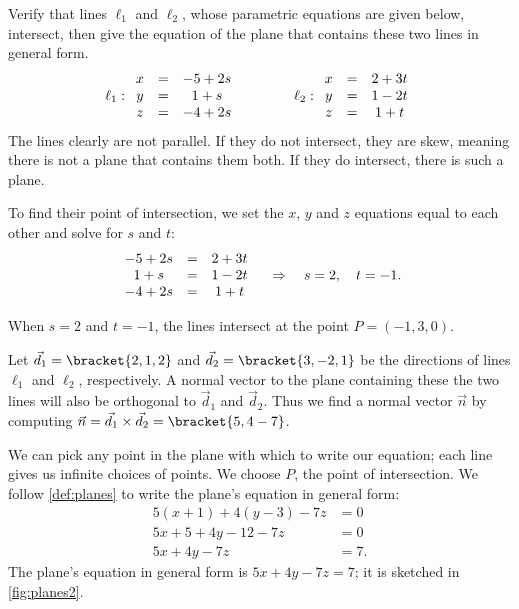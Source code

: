 \begin{example}\label{ex_planes2}%
Verify that lines $\ell_1$ and $\ell_2$, whose parametric equations are given below, intersect, then give the equation of the  plane that contains these two lines in general form.
\[
 \ell_1: \begin{array}{ c c c } x&=&-5+2s \\ y&=&1+s \\ z&=&-4+2s\end{array}
 \qquad\qquad
 \ell_2: \begin{array}{ c c c } x &=& 2+3t\\ y&=&1-2t \\ z&=&1+t\end{array}
\]
\solution
The lines clearly are not parallel. If they do not intersect, they are skew, meaning there is not a plane that contains them both. If they do intersect, there is such a plane. 

To find their point of intersection, we set the $x$, $y$ and $z$ equations equal to each other and solve for $s$ and $t$:
\[
 \begin{array}{ c c c }-5+2s &=&2+3t \\ 1+s &=& 1-2t \\ -4+2s &=& 1+t \end{array}
 \quad  \Rightarrow  \quad s=2,\quad t=-1.
\]

When $s=2$ and $t=-1$, the lines intersect at the point $P= (-1,3,0)$. 

Let $\vec d_1 =\bracket{2,1,2}$ and $\vec d_2=\bracket{3,-2,1}$ be the directions of lines $\ell_1$ and $\ell_2$, respectively. A normal vector to the plane containing these the two lines will also be orthogonal to $\vec d_1$ and $\vec d_2$. Thus we find a normal vector $\vec n$ by computing $\vec n = \vec d_1 \times \vec d_2=\bracket{5,4-7}$.

We can pick any point in the plane with which to write our equation; each line gives us infinite choices of points. We choose $P$, the point of intersection. We follow \autoref{def:planes} to write the plane's equation in general form:
\begin{align*}
5(x+1) +4(y-3) -7z &= 0 \\
5x + 5 + 4y-12 -7z &= 0\\
5x+4y-7z &= 7.
\end{align*}
The plane's equation in general form is $5x+4y-7z=7$; it is sketched in \autoref{fig:planes2}.
\end{example}

